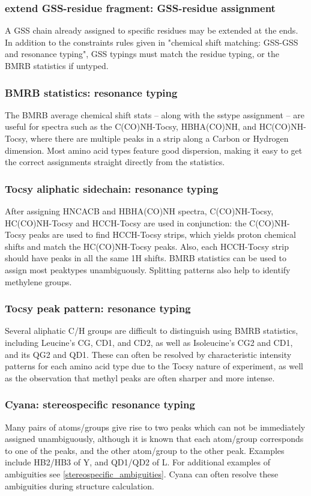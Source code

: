 \subsubsection{extend GSS-residue fragment: GSS-residue assignment}
A GSS chain already assigned to specific residues may be extended at the ends.
In addition to the constraints rules given in 
"chemical shift matching: GSS-GSS and resonance typing",
GSS typings must match the residue typing, or the BMRB statistics if untyped.

\subsubsection{BMRB statistics: resonance typing}
The BMRB average chemical shift stats -- along with the sstype assignment -- 
are useful for spectra such as the C(CO)NH-Tocsy, HBHA(CO)NH, and 
HC(CO)NH-Tocsy, where there are multiple peaks in a strip along a Carbon or
Hydrogen dimension. Most amino acid types feature good dispersion, making it 
easy to get the correct assignments straight directly from the statistics.

\subsubsection{Tocsy aliphatic sidechain: resonance typing}
After assigning HNCACB and HBHA(CO)NH spectra, C(CO)NH-Tocsy, HC(CO)NH-Tocsy 
and HCCH-Tocsy are used in conjunction:
the C(CO)NH-Tocsy peaks are used to find HCCH-Tocsy strips, which yields proton 
chemical shifts and match the HC(CO)NH-Tocsy peaks.  Also, each HCCH-Tocsy 
strip should have peaks in all the same 1H shifts.
BMRB statistics can be used to assign most peaktypes unambiguously.  
Splitting patterns also help to identify methylene groups.

\subsubsection{Tocsy peak pattern: resonance typing}
Several aliphatic C/H groups are difficult to distinguish using BMRB statistics,
including Leucine's CG, CD1, and CD2, as well as Isoleucine's CG2 and CD1, and
its QG2 and QD1. These can often be resolved by characteristic intensity 
patterns for each amino acid type due to the Tocsy nature of experiment,
as well as the observation that methyl peaks are often sharper and more intense.

\subsubsection{Cyana: stereospecific resonance typing}
Many pairs of atoms/groups give rise to two peaks which can not be immediately
assigned unambiguously, although it is known that each atom/group corresponds 
to one of the peaks, and the other atom/group to the other peak.
Examples include HB2/HB3 of Y, and QD1/QD2 of L.
For additional examples of ambiguities see \ref{stereospecific_ambiguities}.
Cyana can often resolve these ambiguities during structure calculation.


